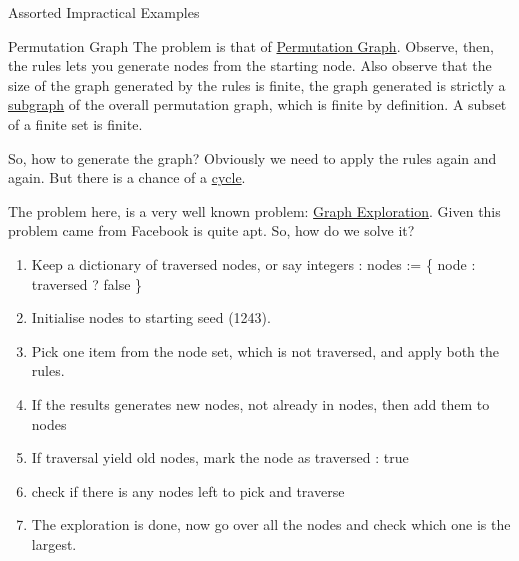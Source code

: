 \begin{section}{Assorted Impractical Examples}
\begin{subsection}{Permutation Graph}
The problem is that of \href{https://en.wikipedia.org/wiki/Permutation\_graph}{Permutation Graph}.
Observe, then, the rules lets you generate nodes from the starting node.
Also observe that the size of the graph generated by the rules is finite, 
the graph generated is strictly a 
\href{https://en.wikipedia.org/wiki/Glossary_of_graph_theory\#subgraph}{subgraph} 
of the overall permutation graph, 
which is finite by definition. A subset of a finite set is finite. 

So, how to generate the graph? Obviously we need to apply the rules again and again.
But there is a chance of a \href{https://en.wikipedia.org/wiki/Cycle\_(graph_theory)}{cycle}.

The problem here, is a very well known problem: 
\href{https://en.wikipedia.org/wiki/Graph\_traversal\#Graph\_exploration}{Graph Exploration}.
Given this problem came from Facebook is quite apt. So, how do we solve it?

\begin{enumerate}
\item{Keep a dictionary of traversed nodes, or say integers : nodes := \{ node : traversed ? false \}  }
\item{Initialise nodes to starting seed (1243). }
\item{Pick one item from the node set, which is not traversed, and apply both the rules. }
\item{If the results generates new nodes, not already in nodes, then add them to nodes }
\item{If traversal yield old nodes, mark the node as traversed : true }
\item{check if there is any nodes left to pick and traverse}
\item{The exploration is done, now go over all the nodes and check which one is the largest. }
\end{enumerate}


\end{subsection}
\end{section}
